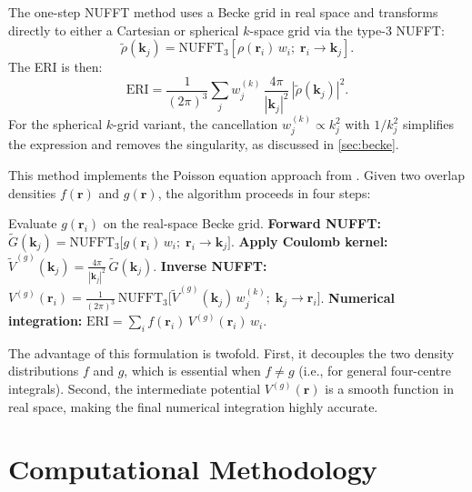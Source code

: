 \documentclass[12pt,a4paper]{article}
\begin{document}
The one-step NUFFT method uses a Becke grid in real space and transforms directly to either a Cartesian or spherical $k$-space grid via the type-3 NUFFT:
\begin{equation}
 \widetilde{\rho}(\mathbf{k}_j) = \text{NUFFT}_3\!\left[\rho(\mathbf{r}_i)\,w_i;\;\mathbf{r}_i \to \mathbf{k}_j\right].
    \label{eq:nufft_forward}
\end{equation}
The ERI is then:
\begin{equation}
 \text{ERI} = \frac{1}{(2\pi)^3}\sum_j w_j^{(k)}\,\frac{4\pi}{|\mathbf{k}_j|^2}\,|\widetilde{\rho}(\mathbf{k}_j)|^2.
    \label{eq:nufft_eri}
\end{equation}
For the spherical $k$-grid variant, the cancellation $w_j^{(k)} \propto k_j^2$ with $1/k_j^2$ simplifies the expression and removes the singularity, as discussed in \cref{sec:becke}.
\label{sec:poisson2step}

This method implements the Poisson equation approach from \cite{vico2016}. Given two overlap densities $f(\mathbf{r})$ and $g(\mathbf{r})$, the algorithm proceeds in four steps:

\begin{algorithm}[H]
\caption{Two-Step Poisson--NUFFT}
\label{alg:poisson}
\begin{algorithmic}[1]
    \STATE Evaluate $g(\mathbf{r}_i)$ on the real-space Becke grid.
    \STATE \textbf{Forward NUFFT:} $\widetilde{G}(\mathbf{k}_j) = \text{NUFFT}_3\bigl[g(\mathbf{r}_i)\,w_i;\;\mathbf{r}_i \to \mathbf{k}_j\bigr]$.
    \STATE \textbf{Apply Coulomb kernel:} $\widetilde{V}^{(g)}(\mathbf{k}_j) = \frac{4\pi}{|\mathbf{k}_j|^2}\,\widetilde{G}(\mathbf{k}_j)$.
    \STATE \textbf{Inverse NUFFT:} $V^{(g)}(\mathbf{r}_i) = \frac{1}{(2\pi)^3}\,\text{NUFFT}_3\bigl[\widetilde{V}^{(g)}(\mathbf{k}_j)\,w_j^{(k)};\;\mathbf{k}_j \to \mathbf{r}_i\bigr]$.
    \STATE \textbf{Numerical integration:} $\text{ERI} = \sum_i f(\mathbf{r}_i)\,V^{(g)}(\mathbf{r}_i)\,w_i$.
\end{algorithmic}
\end{algorithm}

The advantage of this formulation is twofold. First, it decouples the two density distributions $f$ and $g$, which is essential when $f \neq g$ (i.e., for general four-centre integrals). Second, the intermediate potential $V^{(g)}(\mathbf{r})$ is a smooth function in real space, making the final numerical integration highly accurate.


\section{Computational Methodology}
\label{sec:methods}
\end{document}
